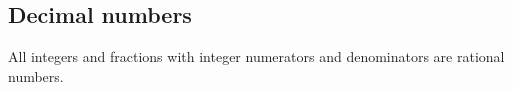 

\subsection*{Decimal numbers}
\nopagebreak
All integers and fractions with integer numerators and denominators are rational numbers. %
\par 
 

